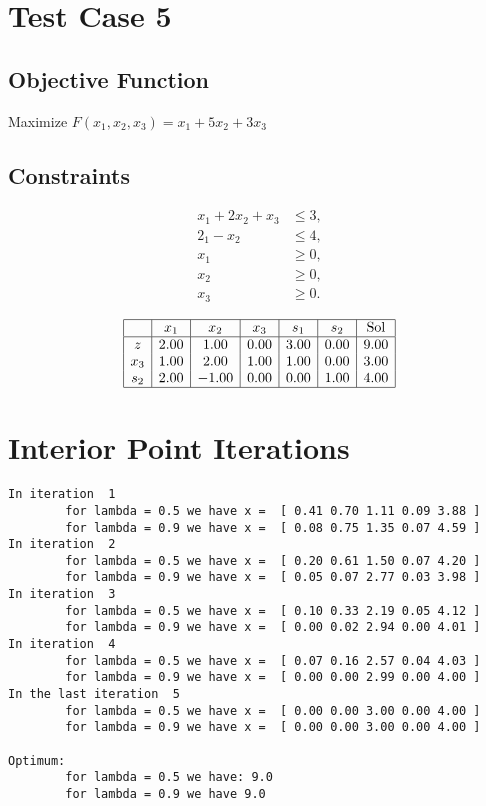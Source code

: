 \documentclass[12pt, legalpaper]{exam}
\begin{document}
\section*{Test Case 5}
 
\subsection*{Objective Function}
Maximize \( F(x_1, x_2, x_3) = x_1 + 5x_2 + 3x_3 \)
 
\subsection*{Constraints}
\begin{align*}
    x_1 + 2x_2 + x_3 &\leq 3, \\
    2_1 - x_2 &\leq 4, \\
    x_1 &\geq 0, \\
    x_2 &\geq 0, \\
    x_3 &\geq 0.
\end{align*}
 
\[
\begin{array}{|c|c|c|c|c|c|c|}
\hline
    & x_1 & x_2 & x_3 & s_1 & s_2 & \text{Sol} \\
\hline
z   & 2.00 & 1.00 & 0.00 & 3.00 & 0.00 & 9.00 \\
x_3 & 1.00 & 2.00 & 1.00 & 1.00 & 0.00 & 3.00 \\
s_2 & 2.00 & -1.00 & 0.00 & 0.00 & 1.00 & 4.00 \\
\hline
\end{array}
\]
 
\section*{Interior Point Iterations}
\small
\begin{verbatim}
In iteration  1 
        for lambda = 0.5 we have x =  [ 0.41 0.70 1.11 0.09 3.88 ] 
        for lambda = 0.9 we have x =  [ 0.08 0.75 1.35 0.07 4.59 ]
In iteration  2 
        for lambda = 0.5 we have x =  [ 0.20 0.61 1.50 0.07 4.20 ] 
        for lambda = 0.9 we have x =  [ 0.05 0.07 2.77 0.03 3.98 ]
In iteration  3 
        for lambda = 0.5 we have x =  [ 0.10 0.33 2.19 0.05 4.12 ] 
        for lambda = 0.9 we have x =  [ 0.00 0.02 2.94 0.00 4.01 ]
In iteration  4 
        for lambda = 0.5 we have x =  [ 0.07 0.16 2.57 0.04 4.03 ] 
        for lambda = 0.9 we have x =  [ 0.00 0.00 2.99 0.00 4.00 ]
In the last iteration  5 
        for lambda = 0.5 we have x =  [ 0.00 0.00 3.00 0.00 4.00 ] 
        for lambda = 0.9 we have x =  [ 0.00 0.00 3.00 0.00 4.00 ]
 
Optimum:
        for lambda = 0.5 we have: 9.0 
        for lambda = 0.9 we have 9.0
\end{verbatim}
\normalsize
 
\end{document}
